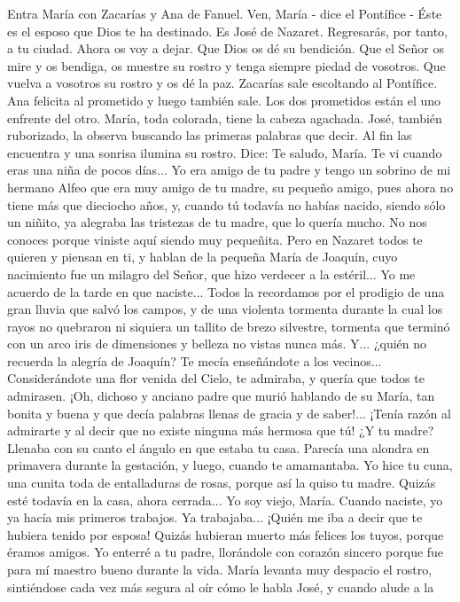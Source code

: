 \documentclass[12pt]{book} %
\begin{document}
Entra María con Zacarías y Ana de Fanuel. 
Ven, María - dice el Pontífice - Éste es el esposo que Dios te ha destinado. Es José de Nazaret. Regresarás, por tanto, a 
tu ciudad. Ahora os voy a dejar. Que Dios os dé su bendición. Que el Señor os mire y os bendiga, os muestre su rostro y tenga siempre piedad de vosotros. Que vuelva a vosotros su rostro y os dé la paz. 
Zacarías sale escoltando al Pontífice. Ana felicita al prometido y luego también sale. 
Los dos prometidos están el uno enfrente del otro. María, toda colorada, tiene la cabeza agachada. José, también 
ruborizado, la observa buscando las primeras palabras que decir. 
Al fin las encuentra y una sonrisa ilumina su rostro. Dice: 
Te saludo, María. Te vi cuando eras una niña de pocos días... Yo era amigo de tu padre y tengo un sobrino de mi hermano Alfeo que era muy amigo de tu madre, su pequeño amigo, pues ahora no tiene más que dieciocho años, y, cuando tú todavía no habías nacido, siendo sólo un niñito, ya alegraba las tristezas de tu madre, que lo quería mucho. No nos conoces porque viniste aquí siendo muy pequeñita. Pero en Nazaret todos te quieren y piensan en ti, y hablan de la pequeña María de Joaquín, cuyo nacimiento fue un milagro del Señor, que hizo verdecer a la estéril... Yo me acuerdo de la tarde en que naciste... Todos la recordamos por el prodigio de una gran lluvia que salvó los campos, y de una violenta tormenta durante la cual los rayos no quebraron ni siquiera un tallito de brezo silvestre, tormenta que terminó con un arco iris de dimensiones y belleza no vistas nunca más. Y... ¿quién no recuerda la alegría de Joaquín? Te mecía enseñándote a los vecinos... Considerándote una flor venida del Cielo, te admiraba, y quería que todos te admirasen. ¡Oh, dichoso y anciano padre que murió hablando de su María, tan bonita y buena y que decía palabras llenas de gracia y de saber!... ¡Tenía razón al admirarte y al decir que no existe ninguna más hermosa que tú! ¿Y tu madre? Llenaba con su canto el ángulo en que estaba tu casa. Parecía una alondra en primavera durante la gestación, y luego, cuando te amamantaba. Yo hice tu cuna, una cunita toda de entalladuras de rosas, porque así la quiso tu madre. Quizás esté todavía en la casa, ahora cerrada... Yo soy viejo, María. Cuando naciste, yo ya hacía mis primeros trabajos. Ya trabajaba... ¡Quién me iba a decir que te hubiera tenido por esposa! Quizás hubieran muerto más felices los tuyos, porque éramos amigos. Yo enterré a tu padre, llorándole con corazón sincero porque fue para mí maestro bueno durante la vida. 
María levanta muy despacio el rostro, sintiéndose cada vez más segura al oír cómo le habla José, y cuando alude a la 
\end{document}
